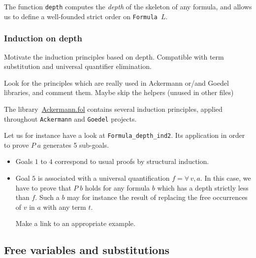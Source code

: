 The function \texttt{depth} computes the \emph{depth} of the 
 skeleton of any formula, and allows us to define a well-founded strict order on 
\texttt{Formula $L$}.


\subsubsection{Induction on depth}



\begin{todo}
Motivate the induction principles based on depth. Compatible with term substitution and universal quantifier elimination.
\end{todo}




\begin{todo}
 Look for the principles which are really used in Ackermann or/and Goedel libraries, and comment them.
 Maybe skip the helpers (unused in other files)
\end{todo}

The library~\href{../theories/html/hydras.Ackermann.fol.html}{Ackermann.fol} contains several induction principles, applied 
throughout \texttt{Ackermann} and \texttt{Goedel} projects.


Let us for instance have a look  at \texttt{Formula\_depth\_ind2}. Its application in order to prove $P\;a$ generates 5 sub-goals. 


\begin{itemize}
\item Goals $1$ to $4$ correspond to  usual proofs by structural induction.
\item Goal $5$ is associated with a universal quantification $f=\forall\,v,a$. In this case, we have to prove that $P\;b$ holds for any formula $b$ which has a depth strictly less than $f$. Such a $b$ may for instance the result of replacing the free occurrences of $v$ in $a$ with any term $t$.
  \begin{todo}
   Make a link to an appropriate example.
  \end{todo}
\end{itemize}



\subsection{Free variables and substitutions}


